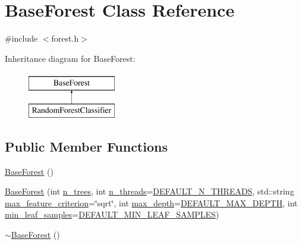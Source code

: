 \hypertarget{class_base_forest}{\section{Base\+Forest Class Reference}
\label{class_base_forest}
}


{\ttfamily \#include $<$forest.\+h$>$}

Inheritance diagram for Base\+Forest\+:\begin{figure}[H]
\begin{center}
\leavevmode
\includegraphics[height=2.000000cm]{class_base_forest}
\end{center}
\end{figure}
\subsection*{Public Member Functions}
\begin{DoxyCompactItemize}
\item 
\hyperlink{class_base_forest_ad32c78f5827091945a82f6b24c1b188e}{Base\+Forest} ()
\item 
\hyperlink{class_base_forest_a21026b45283f5977dcbe9f9cd5bfe4b3}{Base\+Forest} (int \hyperlink{class_base_forest_a2549a0057ec5419fe1de52ef198125ce}{n\+\_\+trees}, int \hyperlink{class_base_forest_a94fe86e1b426d149a11d100921cea3a4}{n\+\_\+threads}=\hyperlink{class_base_forest_a36733c1fadd0daadba8e694ee30fd1b6}{D\+E\+F\+A\+U\+L\+T\+\_\+\+N\+\_\+\+T\+H\+R\+E\+A\+D\+S}, std\+::string \hyperlink{class_base_forest_a5c651ace1f9d5177cdff38a0ae4048f7}{max\+\_\+feature\+\_\+criterion}=\char`\"{}sqrt\char`\"{}, int \hyperlink{class_base_forest_a85cf2e2e202c6e82bf684057181138f6}{max\+\_\+depth}=\hyperlink{class_base_forest_ac6df44eee4d7ee5913ad57d1d6c79692}{D\+E\+F\+A\+U\+L\+T\+\_\+\+M\+A\+X\+\_\+\+D\+E\+P\+T\+H}, int \hyperlink{class_base_forest_a15e0407f3c0fbc4c25e0796c781ff059}{min\+\_\+leaf\+\_\+samples}=\hyperlink{class_base_forest_a3d000d7f9e2410c73b41b70d8e2e58f8}{D\+E\+F\+A\+U\+L\+T\+\_\+\+M\+I\+N\+\_\+\+L\+E\+A\+F\+\_\+\+S\+A\+M\+P\+L\+E\+S})
\item 
\hyperlink{class_base_forest_a39f3ce33df66a2d327395211774bd344}{$\sim$\+Base\+Forest} ()
\end{DoxyCompactItemize}
